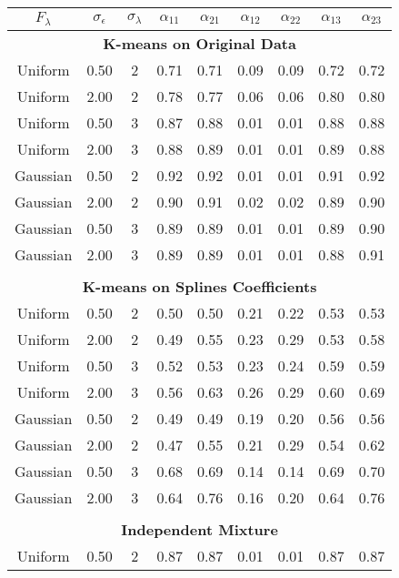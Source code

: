 \begin{table}[ht]
\begin{center}
\begin{tabular}{ccc|cccccc}
  \thickhline $F_{\lambda}$&$\sigma_{\epsilon}$&$\sigma_{\lambda}$&$\alpha_{11}$&$\alpha_{21}$&$\alpha_{12}$&$\alpha_{22}$&$\alpha_{13}$&$\alpha_{23}$\\ \hline\multicolumn{9}{c}{\textbf{K-means on Original Data}}\\ Uniform & 0.50 &   2 & 0.71 & 0.71 & 0.09 & 0.09 & 0.72 & 0.72 \\ 
  Uniform & 2.00 &   2 & 0.78 & 0.77 & 0.06 & 0.06 & 0.80 & 0.80 \\ 
  Uniform & 0.50 &   3 & 0.87 & 0.88 & 0.01 & 0.01 & 0.88 & 0.88 \\ 
  Uniform & 2.00 &   3 & 0.88 & 0.89 & 0.01 & 0.01 & 0.89 & 0.88 \\ 
  Gaussian & 0.50 &   2 & 0.92 & 0.92 & 0.01 & 0.01 & 0.91 & 0.92 \\ 
  Gaussian & 2.00 &   2 & 0.90 & 0.91 & 0.02 & 0.02 & 0.89 & 0.90 \\ 
  Gaussian & 0.50 &   3 & 0.89 & 0.89 & 0.01 & 0.01 & 0.89 & 0.90 \\ 
  Gaussian & 2.00 &   3 & 0.89 & 0.89 & 0.01 & 0.01 & 0.88 & 0.91 \\ 
   \\ \multicolumn{9}{c}{\textbf{K-means on Splines Coefficients}}\\Uniform & 0.50 &   2 & 0.50 & 0.50 & 0.21 & 0.22 & 0.53 & 0.53 \\ 
  Uniform & 2.00 &   2 & 0.49 & 0.55 & 0.23 & 0.29 & 0.53 & 0.58 \\ 
  Uniform & 0.50 &   3 & 0.52 & 0.53 & 0.23 & 0.24 & 0.59 & 0.59 \\ 
  Uniform & 2.00 &   3 & 0.56 & 0.63 & 0.26 & 0.29 & 0.60 & 0.69 \\ 
  Gaussian & 0.50 &   2 & 0.49 & 0.49 & 0.19 & 0.20 & 0.56 & 0.56 \\ 
  Gaussian & 2.00 &   2 & 0.47 & 0.55 & 0.21 & 0.29 & 0.54 & 0.62 \\ 
  Gaussian & 0.50 &   3 & 0.68 & 0.69 & 0.14 & 0.14 & 0.69 & 0.70 \\ 
  Gaussian & 2.00 &   3 & 0.64 & 0.76 & 0.16 & 0.20 & 0.64 & 0.76 \\ 
   \\ \multicolumn{9}{c}{\textbf{Independent Mixture}}\\Uniform & 0.50 &   2 & 0.87 & 0.87 & 0.01 & 0.01 & 0.87 & 0.87 \\ 

\end{tabular}
\end{center}
\end{table}

